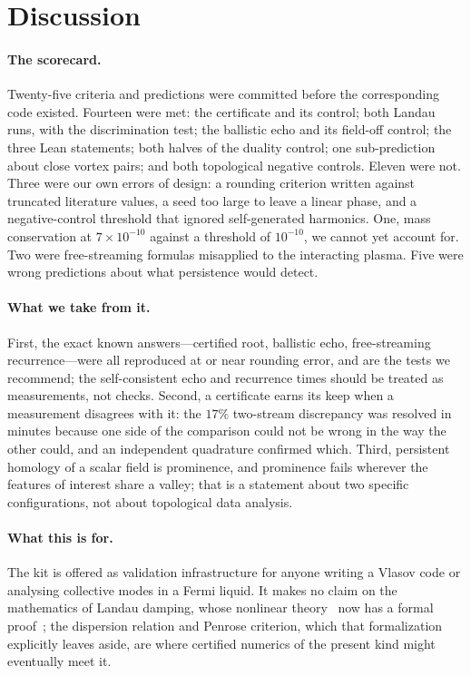 \documentclass[11pt,a4paper]{article}
\begin{document}
\section{Discussion}

\paragraph{The scorecard.} Twenty-five criteria and predictions were committed before the corresponding
code existed. Fourteen were met: the certificate and its control; both Landau runs, with the
discrimination test; the ballistic echo and its field-off control; the three Lean statements; both
halves of the duality control; one sub-prediction about close vortex pairs; and both topological
negative controls. Eleven were not. Three were our own errors of design: a rounding criterion written
against truncated literature values, a seed too large to leave a linear phase, and a negative-control
threshold that ignored self-generated harmonics. One, mass conservation at $7\times10^{-10}$ against a
threshold of $10^{-10}$, we cannot yet account for. Two were free-streaming formulas misapplied to the
interacting plasma. Five were wrong predictions about what persistence would detect.

\paragraph{What we take from it.} First, the exact known answers---certified root, ballistic echo,
free-streaming recurrence---were all reproduced at or near rounding error, and are the tests we
recommend; the self-consistent echo and recurrence times should be treated as measurements, not
checks. Second, a certificate earns its keep when a measurement disagrees with it: the $17\%$
two-stream discrepancy was resolved in minutes because one side of the comparison could not be wrong in
the way the other could, and an independent quadrature confirmed which. Third, persistent homology of a
scalar field is prominence, and prominence fails wherever the features of interest share a valley;
that is a statement about two specific configurations, not about topological data analysis.

\paragraph{What this is for.} The kit is offered as validation infrastructure for anyone writing a
Vlasov code or analysing collective modes in a Fermi liquid. It makes no claim on the mathematics of
Landau damping, whose nonlinear theory~\cite{MouhotVillani2011} now has a formal
proof~\cite{Bedrossian2026}; the dispersion relation and Penrose criterion, which that formalization
explicitly leaves aside, are where certified numerics of the present kind might eventually meet it.
\end{document}
